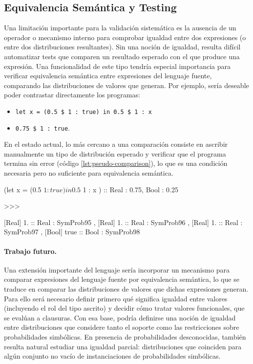 \subsection{Equivalencia Semántica y Testing}\label{subsec:lim-igualdad}

Una limitación importante para la validación sistemática es la
ausencia de un operador o mecanismo interno para comprobar igualdad
entre dos expresiones (o entre dos distribuciones resultantes). Sin
una noción de igualdad, resulta difícil automatizar tests que comparen
un resultado esperado con el que produce una expresión. Una
funcionalidad de este tipo tendría especial importancia para verificar
equivalencia semántica entre expresiones del lenguaje fuente,
comparando las distribuciones de valores que generan. Por ejemplo,
sería deseable poder contrastar directamente los programas:
\begin{itemize}
\item \lstinline|let x = (0.5 $ 1 : true) in 0.5 $ 1 : x| 
\item \lstinline|0.75 $ 1 : true|.
\end{itemize}


En el estado actual, lo más cercano a una comparación consiste en
ascribir manualmente un tipo de distribución esperado y verificar que
el programa termina sin error (código \ref{lst:pseudo-comparison}), lo
que es una condición necesaria pero no suficiente para equivalencia
semántica.

\begin{gplcblock}[caption={Verificación de tipo de distribución},label={lst:pseudo-comparison}]
(let x = (0.5 $ 1 : true) in  0.5 $ 1 : x ) :: {Real : 0.75, Bool : 0.25}

>>>

{
	 [Real] 1. :: Real : SymProb95 ,
	 [Real] 1. :: Real : SymProb96 ,
	 [Real] 1. :: Real : SymProb97 ,
	 [Bool] true :: Bool : SymProb98 
}  
\end{gplcblock}


\paragraph{Trabajo futuro.}
Una extensión importante del lenguaje sería
incorporar un mecanismo para comparar expresiones
del lenguaje fuente por equivalencia semántica, lo
que se traduce en comparar las distribuciones de
valores que dichas expresiones generan. Para ello
será necesario definir primero qué significa
igualdad entre valores (incluyendo el rol del tipo
ascrito) y decidir cómo tratar valores
funcionales, que se evalúan a clausuras. Con esa
base, podría definirse una noción de igualdad
entre distribuciones que considere tanto el
soporte como las restricciones sobre
probabilidades simbólicas. En presencia de
probabilidades desconocidas, también resulta natural estudiar
una igualdad parcial: distribuciones
que coinciden para algún conjunto no vacío de
instanciaciones de probabilidades simbólicas.

